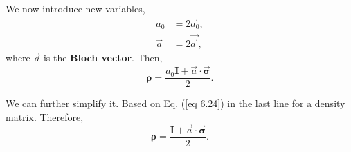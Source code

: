 \documentclass{article}
\begin{document}
We now introduce new variables,
\begin{align*}\label{eq 6.45}
    a_0&=2a_0^\prime,\tag{6.45}\\
    \vec{a}&=2\vec{a^\prime},\tag{6.46}
\end{align*}
where $\vec{a}$ is the \textbf{Bloch vector}. Then,
\begin{equation}\label{eq 6.47}
    \boldsymbol{\rho}=\frac{a_0\boldsymbol{I}+\vec{a}\cdot\vec{\boldsymbol{\sigma}}}{2}.\tag{6.47}
\end{equation}

We can further simplify it. Based on Eq. (\ref{eq 6.24}) in the last
line for a density matrix. Therefore,
\begin{equation}\label{eq 6.49}
    \boldsymbol{\rho}=\frac{\boldsymbol{I}+\vec{a}\cdot\vec{\boldsymbol{\sigma}}}{2}.\tag{6.49}
\end{equation}
\end{document}
